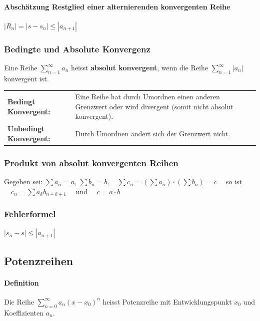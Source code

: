 \paragraph{Abschätzung Restglied einer alternierenden konvergenten Reihe}
	\qquad $|R_n| = |s-s_n|\leq |a_{n+1}|$


\subsubsection{Bedingte und Absolute Konvergenz}
Eine Reihe $\sum\limits_{n=1}^{\infty}a_n$ heisst \textbf{absolut konvergent}, wenn die
Reihe $\sum\limits_{n=1}^{\infty}|a_n|$ konvergent ist.\\

\begin{tabular}{ p{4.5cm}  p{13.5cm}}
	\textbf{Bedingt Konvergent:} &  Eine Reihe hat durch Umordnen einen anderen Grenzwert oder wird divergent (somit nicht absolut konvergent).\\
	\textbf{Unbedingt Konvergent:} &  Durch Umordnen ändert sich der Grenzwert nicht.\\
\end{tabular}


\subsubsection{Produkt von absolut konvergenten Reihen} 
Gegeben sei: $\sum a_n=a$, \quad $\sum b_n=b, \quad \sum c_n = (\sum a_n) \cdot (\sum b_n) = c \quad $ so ist
$ \quad c_n=\sum a_kb_{n-k+1} \quad $ und $ \quad c = a \cdot b $

\subsubsection{Fehlerformel}
	\qquad $|s_n-s|\leq |a_{n+1}|$

\subsection{Potenzreihen}

\paragraph{Definition} 
Die Reihe $ \sum\limits_{n=0}^{\infty} a_n (x-x_0)^n $ heisst Potenzreihe mit Entwicklungspunkt $x_0$ und Koeffizienten $a_n$.

